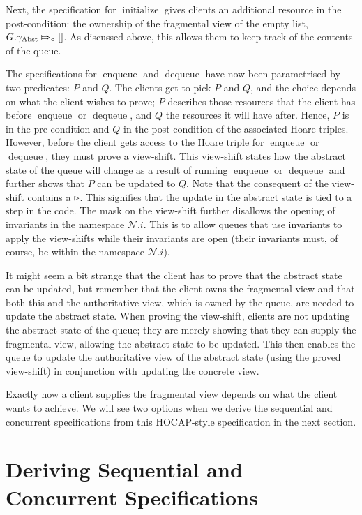 \documentclass[a4paper, 10pt]{report}
\theoremstyle{definition}
\newcommand{\initialise}{\operatorname{initialize}}
\newcommand{\enqueue}{\operatorname{enqueue}}
\newcommand{\dequeue}{\operatorname{dequeue}}
\newcommand{\Qg}{G}
\newcommand{\gabst}{\gname_{\mathrm{Abst}}}
\newcommand{\Nl}{\ensuremath{\mathcal{N}}}
\newcommand{\abstractstatefullfrag}[2]{#1 \Mapsto_{\circ} #2}
\begin{document}
Next, the specification for $\initialise$ gives clients an additional resource in the post-condition: the ownership of the fragmental view of the empty list, $\abstractstatefullfrag{\Qg.\gabst}{[]}$. As discussed above, this allows them to keep track of the contents of the queue.

The specifications for $\enqueue$ and $\dequeue$ have now been parametrised by two predicates: $P$ and $Q$. The clients get to pick $P$ and $Q$, and the choice depends on what the client wishes to prove; $P$ describes those resources that the client has before $\enqueue$ or $\dequeue$, and $Q$ the resources it will have after. Hence, $P$ is in the pre-condition and $Q$ in the post-condition of the associated Hoare triples. However, before the client gets access to the Hoare triple for $\enqueue$ or $\dequeue$, they must prove a view-shift. This view-shift states how the abstract state of the queue will change as a result of running $\enqueue$ or $\dequeue$ and further shows that $P$ can be updated to $Q$. Note that the consequent of the view-shift contains a $\mathop{\triangleright}$. This signifies that the update in the abstract state is tied to a step in the code. The mask on the view-shift further disallows the opening of invariants in the namespace $\Nl.i$. This is to allow queues that use invariants to apply the view-shifts while their invariants are open (their invariants must, of course, be within the namespace $\Nl.i$).

It might seem a bit strange that the client has to prove that the abstract state can be updated, but remember that the client owns the fragmental view and that both this and the authoritative view, which is owned by the queue, are needed to update the abstract state. When proving the view-shift, clients are not updating the abstract state of the queue; they are merely showing that they can supply the fragmental view, allowing the abstract state to be updated. This then enables the queue to update the authoritative view of the abstract state (using the proved view-shift) in conjunction with updating the concrete view.

Exactly how a client supplies the fragmental view depends on what the client wants to achieve. We will see two options when we derive the sequential and concurrent specifications from this HOCAP-style specification in the next section.

\section{Deriving Sequential and Concurrent Specifications}
\label{QueueSpecs:section:deriving-seq-and-conc}
\end{document}
